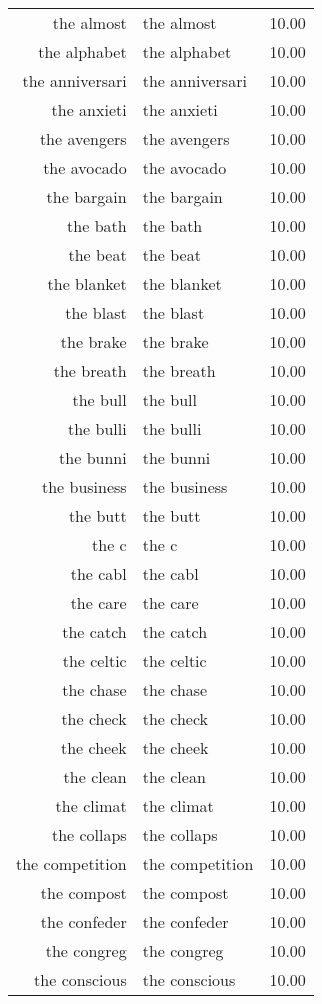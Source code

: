 \begin{table}[ht]
\begin{tabular}{rlr}
  the almost & the almost & 10.00 \\ 
  the alphabet & the alphabet & 10.00 \\ 
  the anniversari & the anniversari & 10.00 \\ 
  the anxieti & the anxieti & 10.00 \\ 
  the avengers & the avengers & 10.00 \\ 
  the avocado & the avocado & 10.00 \\ 
  the bargain & the bargain & 10.00 \\ 
  the bath & the bath & 10.00 \\ 
  the beat & the beat & 10.00 \\ 
  the blanket & the blanket & 10.00 \\ 
  the blast & the blast & 10.00 \\ 
  the brake & the brake & 10.00 \\ 
  the breath & the breath & 10.00 \\ 
  the bull & the bull & 10.00 \\ 
  the bulli & the bulli & 10.00 \\ 
  the bunni & the bunni & 10.00 \\ 
  the business & the business & 10.00 \\ 
  the butt & the butt & 10.00 \\ 
  the c & the c & 10.00 \\ 
  the cabl & the cabl & 10.00 \\ 
  the care & the care & 10.00 \\ 
  the catch & the catch & 10.00 \\ 
  the celtic & the celtic & 10.00 \\ 
  the chase & the chase & 10.00 \\ 
  the check & the check & 10.00 \\ 
  the cheek & the cheek & 10.00 \\ 
  the clean & the clean & 10.00 \\ 
  the climat & the climat & 10.00 \\ 
  the collaps & the collaps & 10.00 \\ 
  the competition & the competition & 10.00 \\ 
  the compost & the compost & 10.00 \\ 
  the confeder & the confeder & 10.00 \\ 
  the congreg & the congreg & 10.00 \\ 
  the conscious & the conscious & 10.00 \\ 

\end{tabular}
\end{table}
